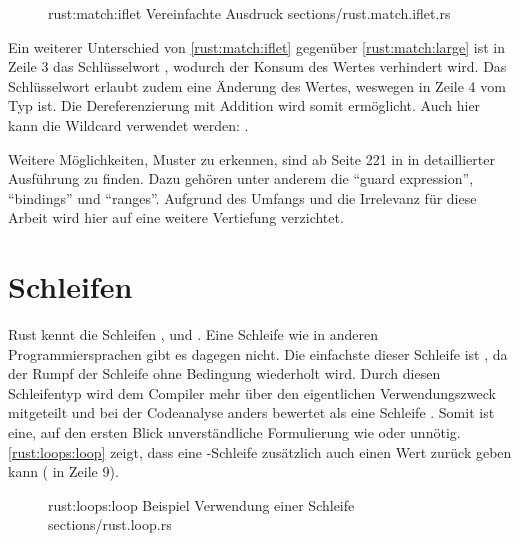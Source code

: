 \begin{figure}[H]
	\rustcinclude
		{rust:match:iflet}
		{Vereinfachte  Ausdruck}
		{sections/rust.match.iflet.rs}
\end{figure}

Ein weiterer Unterschied von \autoref{rust:match:iflet} gegenüber \autoref{rust:match:large} ist in Zeile 3 das Schlüsselwort , wodurch der Konsum des Wertes verhindert wird.
Das Schlüsselwort  erlaubt zudem eine Änderung des Wertes, weswegen  in Zeile 4 vom Typ  ist.
Die Dereferenzierung mit Addition wird somit ermöglicht.
Auch hier kann die Wildcard verwendet werden: .

Weitere Möglichkeiten, Muster zu erkennen, sind ab Seite 221 in \cite{rust:orly_programming} in detaillierter Ausführung zu finden.
Dazu gehören unter anderem die \enquote{guard expression}, \enquote{bindings} und \enquote{ranges}.
Aufgrund des Umfangs und die Irrelevanz für diese Arbeit wird hier auf eine weitere Vertiefung verzichtet.

\section{Schleifen}


Rust kennt die Schleifen ,  und .
Eine  Schleife wie in anderen Programmiersprachen gibt es dagegen nicht.
Die einfachste dieser Schleife ist , da der Rumpf der Schleife ohne Bedingung wiederholt wird.
Durch diesen Schleifentyp wird dem Compiler mehr über den eigentlichen Verwendungszweck mitgeteilt und bei der Codeanalyse anders bewertet als eine  Schleife \cite{rust:book:loops}.
Somit ist eine, auf den ersten Blick unverständliche Formulierung wie  oder  unnötig.
\autoref{rust:loops:loop} zeigt, dass eine -Schleife zusätzlich auch einen Wert zurück geben kann ( in Zeile 9).


\begin{figure}[H]
	\rustcinclude
		{rust:loops:loop}
		{Beispiel Verwendung einer  Schleife}
		{sections/rust.loop.rs}
\end{figure}


